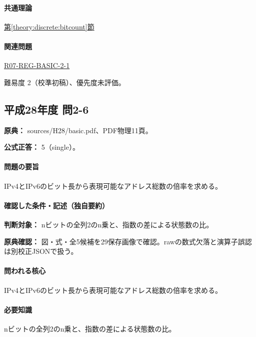 \paragraph{共通理論} \hyperref[theory:discrete:bitcount]{第\ref*{theory:discrete:bitcount}節}

\paragraph{関連問題} \hyperref[q:r07-reg-basic-2-1]{R07-REG-BASIC-2-1}

\par 難易度 2（校準初稿）、優先度未評価。

\subsection{平成28年度 問2-6}
\label{q:h28-reg-basic-2-6}

\noindent\textbf{原典：} sources/H28/basic.pdf、PDF物理11頁。

\textbf{公式正答：} 5（single）。

\paragraph{問題の要旨} IPv4とIPv6のビット長から表現可能なアドレス総数の倍率を求める。

\paragraph{確認した条件・記述（独自要約）}\mbox{}\par

\noindent\textbf{判断対象：} nビットの全列2のn乗と、指数の差による状態数の比。\par

\noindent\textbf{原典確認：} 図・式・全5候補を29保存画像で確認。rawの数式欠落と演算子誤認は別校正JSONで扱う。\par

\paragraph{問われる核心} IPv4とIPv6のビット長から表現可能なアドレス総数の倍率を求める。

\paragraph{必要知識} nビットの全列2のn乗と、指数の差による状態数の比。

